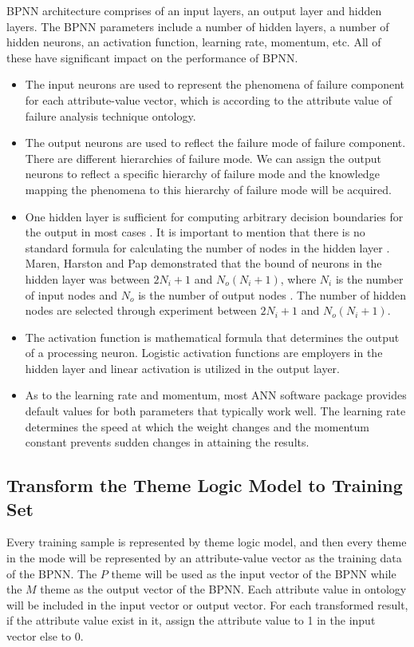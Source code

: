 \documentclass{elsarticle}
\begin{document}
BPNN architecture comprises of an input layers, an output layer and hidden layers. The BPNN parameters include a number of hidden layers, a number of hidden neurons, an activation function, learning rate, momentum, etc. All of these have significant impact on the performance of BPNN.
\begin{itemize}
\item The input neurons are used to represent the phenomena of failure
  component for each attribute-value vector, which is according to the attribute value of failure analysis technique ontology.
\item The output neurons are used to reflect the failure mode of failure component. There are different hierarchies of failure mode. We can assign the output neurons to reflect a specific hierarchy of failure mode and the knowledge mapping the phenomena to this hierarchy of failure mode will be acquired. 
\item One hidden layer is sufficient for computing arbitrary decision
  boundaries for the output in most cases \cite{Khaw1995}. It is important to
  mention that there is no standard formula for calculating the number
  of nodes in the hidden layer \cite{turban:oaj}. Maren, Harston
  and Pap demonstrated that the bound of neurons in the hidden layer
  was between $2N_i+1$ and $N_o(N_i +1)$, where $N_i$ is the number of
  input nodes and $N_o$ is the number of output nodes
  \cite{maren1990hnc}. The number of hidden nodes are selected through
  experiment between $2N_i+1$ and $N_o(N_i +1)$. 
\item The activation function is mathematical formula that determines the output of a processing neuron. Logistic activation functions are employers in the hidden layer and linear activation is utilized in the output layer.  
\item As to the learning rate and momentum, most ANN software package provides default values for both parameters that typically work well. The learning rate determines the speed at which the weight changes and the momentum constant prevents sudden changes in attaining the results.  


\end{itemize}

\subsection{Transform the Theme Logic Model to Training Set}
\label{sec:transf-theme-logic}

Every training sample is represented by theme logic model, and then
every theme in the mode will be represented by an attribute-value
vector as the training data of the BPNN. The $P$ theme will be  used as
the input vector of the BPNN while the $M$ theme as the output vector of
the BPNN. Each attribute value in ontology will be included in the
input vector or output vector. For each transformed result, if the attribute value exist in it, assign the attribute value to 1 in the input vector else to 0. 
\end{document}
